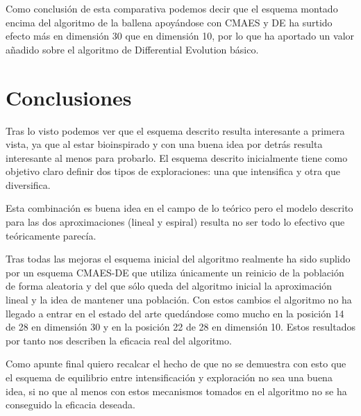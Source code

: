 \documentclass[12pt,a4paper]{article}
\begin{document}
	Como conclusión de esta comparativa podemos decir que el esquema montado encima del algoritmo de la ballena apoyándose con CMAES y DE ha surtido efecto más en dimensión 30 que en dimensión 10, por lo que ha aportado un valor añadido sobre el algoritmo de Differential Evolution básico.
	
	\section{Conclusiones}
	
	Tras lo visto podemos ver que el esquema descrito resulta interesante a primera vista, ya que al estar bioinspirado y con una buena idea por detrás resulta interesante al menos para probarlo. El esquema descrito inicialmente tiene como objetivo claro definir dos tipos de exploraciones: una que intensifica y otra que diversifica.
	
	Esta combinación es buena idea en el campo de lo teórico pero el modelo descrito para las dos aproximaciones (lineal y espiral) resulta no ser todo lo efectivo que teóricamente parecía.
	
	Tras todas las mejoras el esquema inicial del algoritmo realmente ha sido suplido por un esquema CMAES-DE que utiliza únicamente un reinicio de la población de forma aleatoria y del que sólo queda del algoritmo inicial la aproximación lineal y la idea de mantener una población. Con estos cambios el algoritmo no ha llegado a entrar en el estado del arte quedándose como mucho en la posición 14 de 28 en dimensión 30 y en la posición 22 de 28 en dimensión 10. Estos resultados por tanto nos describen la eficacia real del algoritmo.
	
	Como apunte final quiero recalcar el hecho de que no se demuestra con esto que el esquema de equilibrio entre intensificación y exploración no sea una buena idea, si no que al menos con estos mecanismos tomados en el algoritmo no se ha conseguido la eficacia deseada.
	
	
	
	
	
	\newpage
	\clearpage
	
\end{document}
